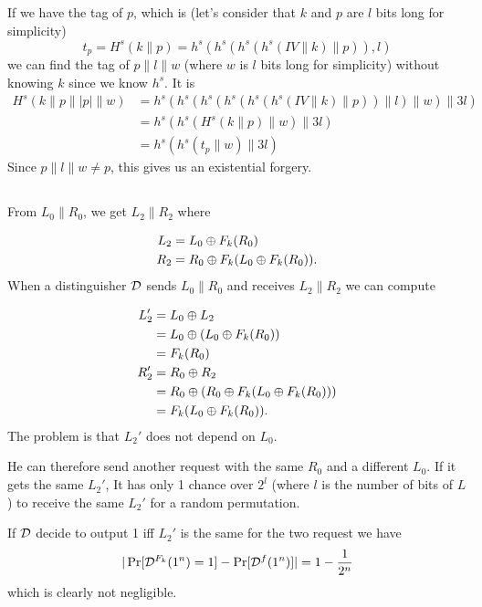 \subsection{}
\begin{solution}
  If we have the tag of $p$, which is (let's consider that $k$ and $p$ are $l$ bits long for simplicity)
  \[ t_p = H^s(k\|p) = h^s(h^s(h^s(h^s(IV \| k) \| p)), l) \]
  we can find the tag of $p\|l\|w$ (where $w$ is $l$ bits long for simplicity)
  without knowing $k$ since we know $h^s$.
  It is
  \begin{align*}
    H^s(k\|p\||p|\|w)
    & = h^s(h^s(h^s(h^s(h^s(h^s(IV \| k) \| p)) \| l) \| w) \| 3l)\\
    & = h^s(h^s(H^s(k \| p) \| w) \| 3l)\\
    & = h^s(h^s(t_p \| w) \| 3l)
  \end{align*}
  Since $p\|l\|w \neq p$, this gives us an existential forgery.
\end{solution}

\subsection{}
\begin{solution}
  From $L_0\|R_0$, we get $L_2\|R_2$
  where

  \begin{align*}
    L_2 & = L_0 \oplus F_k(R_0)\\
    R_2 & = R_0 \oplus F_k(L_0 \oplus F_k(R_0)).
  \end{align*}
  When a distinguisher $\mathcal{D}$ sends $L_0\|R_0$ and receives
  $L_2\|R_2$ we can
  compute

  \begin{align*}
    L_2' & = L_0 \oplus L_2\\
         & = L_0 \oplus (L_0 \oplus F_k(R_0))\\
         & = F_k(R_0)\\
    R_2' & = R_0 \oplus R_2\\
         & = R_0 \oplus (R_0 \oplus F_k(L_0 \oplus F_k(R_0)))\\
         & = F_k(L_0 \oplus F_k(R_0)).
  \end{align*}
  The problem is that $L_2'$ does not depend on $L_0$.

  He can therefore send another request with the same $R_0$
  and a different $L_0$.
  If it gets the same $L_2'$,
  It has only 1 chance over $2^l$ (where $l$ is the number of bits of $L$) to receive the same $L_2'$ for a random permutation.

  If $\mathcal{D}$ decide to output 1 iff $L_2'$ is the same for the two request we have
  \[ |\Pr[\mathcal{D}^{F_k}(1^n) = 1] -\Pr[\mathcal{D}^f(1^n)]| = 1 - \frac{1}{2^n} \]
  which is clearly not negligible.
\end{solution}


